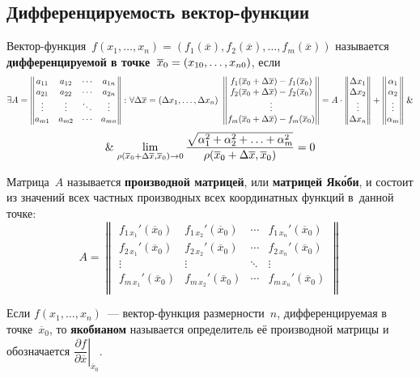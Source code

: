 \subsection{Дифференцируемость вектор-функции}
 Вектор-функция~$f(x_1, \ldots, x_n) = (f_1(\overline x), f_2(\overline x), \ldots, f_m(\overline x))$ называется \textbf{дифференцируемой в точке~$\overline x_0 \opbr= (x_{10}, \ldots, x_{n0})$}, если
\begin{equation*}
\exists A =
\begin{Vmatrix}
a_{11} & a_{12} & \cdots & a_{1n} \\
a_{21} & a_{22} & \cdots & a_{2n} \\
\vdots & \vdots & \ddots & \vdots \\
a_{m1} & a_{m2} & \cdots & a_{mn}
\end{Vmatrix} \colon
\forall \Delta \overline x = (\Delta x_1, \ldots, \Delta x_n) \
\begin{Vmatrix}
f_1(\overline x_0 + \Delta \overline x) - f_1(\overline x_0) \\
f_2(\overline x_0 + \Delta \overline x) - f_2(\overline x_0) \\
\vdots \\
f_m(\overline x_0 + \Delta \overline x) - f_m(\overline x_0)
\end{Vmatrix} =
A \cdot
\begin{Vmatrix}
\Delta x_1 \\
\Delta x_2 \\
\vdots \\
\Delta x_n
\end{Vmatrix} +
\begin{Vmatrix}
\alpha_1 \\
\alpha_2 \\
\vdots \\
\alpha_m
\end{Vmatrix} \mathrel{\&}
\end{equation*}
\begin{equation*}
\mathrel{\&} \lim_{\rho(\overline x_0 + \Delta \overline x, \overline x_0) \to 0}
\frac{\sqrt{\alpha_1^2 + \alpha_2^2 + \ldots + \alpha_m^2}}
{\rho(\overline x_0 + \Delta \overline x, \overline x_0)} = 0
\end{equation*}

  Матрица~$A$ называется \textbf{производной матрицей}, или \textbf{матрицей Як\'{о}би}, и состоит из значений всех частных производных всех координатных функций в~данной точке:
\begin{equation*}
A =
\begin{Vmatrix}
f_{1\, x_1}'(\overline x_0) & f_{1\, x_2}'(\overline x_0) & \cdots & f_{1\, x_n}'(\overline x_0) \\
f_{2\, x_1}'(\overline x_0) & f_{2\, x_2}'(\overline x_0) & \cdots & f_{2\, x_n}'(\overline x_0) \\
\vdots & \vdots & \ddots & \vdots \\
f_{m\, x_1}'(\overline x_0) & f_{m\, x_2}'(\overline x_0) & \cdots & f_{m\, x_n}'(\overline x_0) \\
\end{Vmatrix}
\end{equation*}

 Если $f(x_1, \ldots, x_n)$~--- вектор-функция размерности~$n$, дифференцируемая в точке~$\overline x_0$, то \textbf{якобианом} называется определитель её производной матрицы и обозначается $\left. \dfrac{\partial f}{\partial \overline x} \right|_{\overline x_0}$.
